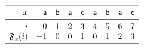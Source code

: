 \documentclass[11pt]{article}
\begin{document}
\TeXtoEPS
\(
\begin{array}{rrrrrrrrrr}
\toprule
  x & \word{a} & \word{b} & \word{a} & \word{c} 
    & \word{a} & \word{b} & \word{a} & \word{c}\\
\midrule
  i &  0 & 1 & 2 & 3 & 4 & 5 & 6 & 7\\
  \MPfailure{x}{}{i}
    & -1 & 0 & 0 & 1 & 0 & 1 & 2 & 3\\
\bottomrule
\end{array}
\)
\endTeXtoEPS
\end{document}
